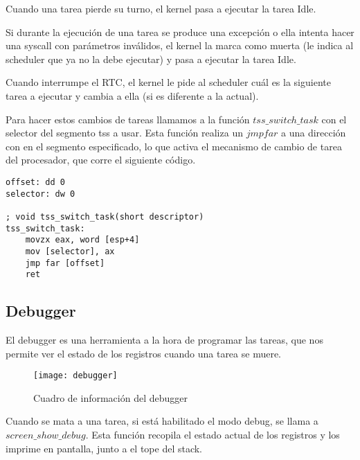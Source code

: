 Cuando una tarea pierde su turno, el kernel pasa a ejecutar la tarea Idle.

Si durante la ejecución de una tarea se produce una excepción
o ella intenta hacer una syscall con parámetros inválidos,
el kernel la marca como muerta (le indica al scheduler que ya no la debe ejecutar)
y pasa a ejecutar la tarea Idle.

Cuando interrumpe el RTC, el kernel le pide al scheduler cuál es la siguiente tarea
a ejecutar y cambia a ella (si es diferente a la actual).

Para hacer estos cambios de tareas llamamos a la función $tss\_switch\_task$ con el
selector del segmento tss a usar. Esta función realiza un $jmp far$ a una dirección
con en el segmento especificado, lo que activa el mecanismo de cambio de tarea del
procesador, que corre el siguiente código.

\begin{lstlisting}
offset: dd 0
selector: dw 0

; void tss_switch_task(short descriptor)
tss_switch_task:
    movzx eax, word [esp+4]
    mov [selector], ax
    jmp far [offset]
    ret
\end{lstlisting}

\subsection{Debugger}

El debugger es una herramienta a la hora de programar las tareas, que nos permite ver el estado
de los registros cuando una tarea se muere.

\begin{figure}[H]
    \centering
    \texttt{[image: debugger]}
    \caption{Cuadro de información del debugger}
    \label{fig:gates}
\end{figure}

Cuando se mata a una tarea, si está habilitado el modo debug,
se llama a $screen\_show\_debug$.
Esta función recopila el estado actual de los registros y los imprime en pantalla,
junto a el tope del stack.

